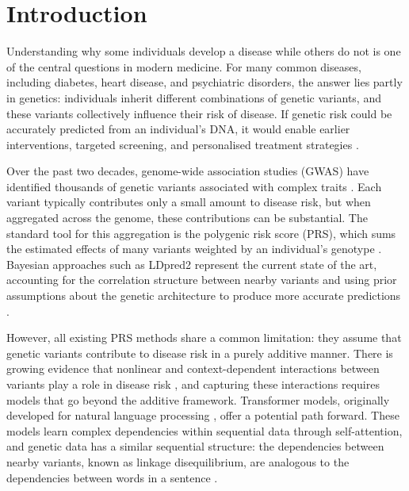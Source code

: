 \chapter{Introduction}
\label{ch:introduction}

Understanding why some individuals develop a disease while others do not
is one of the central questions in modern medicine. For many common
diseases, including diabetes, heart disease, and psychiatric disorders,
the answer lies partly in genetics: individuals inherit different
combinations of genetic variants, and these variants collectively
influence their risk of disease. If genetic risk could be accurately
predicted from an individual's DNA, it would enable earlier
interventions, targeted screening, and personalised treatment strategies
\citep{Torkamani2018}.

Over the past two decades, genome-wide association studies (GWAS) have
identified thousands of genetic variants associated with complex traits
\citep{Visscher2017}. Each variant typically contributes only a small
amount to disease risk, but when aggregated across the genome, these
contributions can be substantial. The standard tool for this aggregation
is the polygenic risk score (PRS), which sums the estimated effects of
many variants weighted by an individual's genotype
\citep{Choi2020}. Bayesian approaches such as LDpred2 represent the
current state of the art, accounting for the correlation structure
between nearby variants and using prior assumptions about the genetic
architecture to produce more accurate predictions \citep{Prive2023}.

However, all existing PRS methods share a common limitation: they assume
that genetic variants contribute to disease risk in a purely additive
manner. There is growing evidence that nonlinear and context-dependent
interactions between variants play a role in disease risk
\citep{Cordell2009}, and capturing these interactions requires models
that go beyond the additive framework. Transformer models, originally
developed for natural language processing \citep{AttentionIsAllYouNeed},
offer a potential path forward. These models learn complex dependencies
within sequential data through self-attention, and genetic data has a
similar sequential structure: the dependencies between nearby variants,
known as linkage disequilibrium, are analogous to the dependencies
between words in a sentence \citep{SNPbag}.

